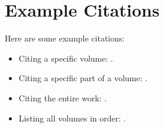 \documentclass{article}
\begin{document}
\section*{Example Citations}

Here are some example citations:

\begin{itemize}
    \item Citing a specific volume: \cite{smith2023vol1}.
    \item Citing a specific part of a volume: \cite{smith2023vol4part1}.
    \item Citing the entire work: \cite{smith2023allvols}.
    \item Listing all volumes in order: \cite{smith2023vol1,smith2023vol2,smith2023vol3,smith2023vol4part1,smith2023vol4part2,smith2023vol5,smith2023vol6,smith2023vol7}.
\end{itemize}

\printbibliography
\end{document}
